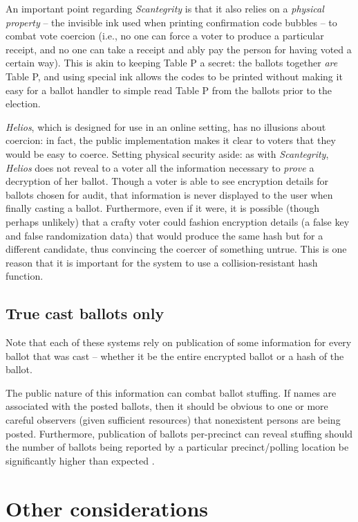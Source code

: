 \documentclass[10pt,twocolumn]{article}
\newcommand{\term}[1]{\textit{#1}}
\begin{document}
An important point regarding \term{Scantegrity} is that it also relies on a \emph{physical property} -- the
invisible ink used when printing confirmation code bubbles -- to combat vote coercion (i.e., no
one can force a voter to produce a particular receipt, and no one can take a receipt and ably pay
the person for having voted a certain way). This is akin to keeping Table P a secret: the ballots
together \emph{are} Table P, and using special ink allows the codes to be printed without making it
easy for a ballot handler to simple read Table P from the ballots prior to the election.

\term{Helios}, which is designed for use in an online setting, has no illusions about coercion: in fact,
the public implementation makes it clear to voters that they would be easy to coerce. Setting
physical security aside: as with \term{Scantegrity}, \term{Helios} does not reveal to a voter all the
information necessary to \emph{prove} a decryption of her ballot. Though a voter is able to see
encryption details for ballots chosen for audit, that information is never displayed to the user
when finally casting a ballot. Furthermore, even if it were, it is possible (though perhaps
unlikely) that a crafty voter could fashion encryption details (a false key and false randomization
data) that would produce the same hash but for a different candidate, thus convincing the coercer
of something untrue.
This is one reason that it is important for the system to use a collision-resistant hash function.

\subsection{True cast ballots only}

Note that each of these systems rely on publication of some information for every ballot that was
cast -- whether it be the entire encrypted ballot or a hash of the ballot.

The public nature of this information can combat ballot stuffing. If names are associated with
the posted ballots, then it should be obvious to one or more careful observers (given sufficient
resources) that nonexistent persons are being posted. Furthermore, publication of ballots
per-precinct can reveal stuffing should the number of ballots being reported by a particular
precinct/polling location be significantly higher than expected \cite{helios}.

\section{Other considerations}
\end{document}
